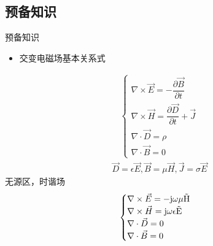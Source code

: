 \subsection{预备知识}
\begin{frame}{预备知识}
    \begin{itemize}
        \item 交变电磁场基本关系式
    \end{itemize}
    \begin{align*}
        \begin{cases}
            \nabla\times\vec{E}=-\dfrac{\partial \vec{B}}{\partial t}\\
            \nabla\times\vec{H}=\dfrac{\partial \vec{D}}{\partial t}+\vec{J}\\
            \nabla\cdot\vec{D}=\rho\\
            \nabla\cdot\vec{B}=0
        \end{cases}
    \end{align*}
    \begin{align*}
        \vec{D}=\epsilon\vec{E},\vec{B}=\mu\vec{H},\vec{J}=\sigma\vec{E}
    \end{align*}
    无源区，时谐场
    \begin{align*}
        \begin{cases}
            \nabla\times\vec{E}=-\rm{j}\omega\mu\vec{H}\\
            \nabla\times\vec{H}=\rm{j}\omega\epsilon\vec{E}\\
            \nabla\cdot\vec{D}=0\\
            \nabla\cdot\vec{B}=0
        \end{cases}
    \end{align*}
\end{frame}

